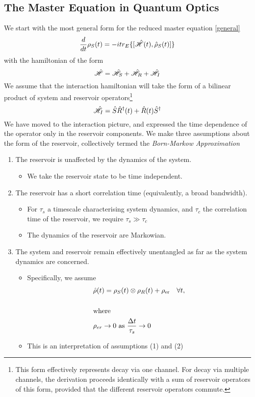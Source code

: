 \subsection{The Master Equation in Quantum Optics}
We start with the most general form for the reduced master equation \cref{general}
\begin{equation}
	\frac{d}{dt} \rho_S (t) = -itr_E\{[\hat{\mathscr{H}}(t), \hat{\rho}_S(t)]\}
\end{equation}
with the hamiltonian of the form 
\begin{equation}
  \hat{\mathscr{H}} = \hat{\mathscr{H}}_S + \hat{\mathscr{H}}_R + \hat{\mathscr{H}}_{I}
\end{equation}
We assume that the interaction hamiltonian will take the form of a bilinear product of system and reservoir operators\footnote{This form effectively represents decay via one channel. For decay via multiple channels, the derivation proceeds identically with a sum of reservoir operators of this form, provided that the different reservoir operators commute.}
\begin{equation}
  \hat{\mathscr{H}}_{I} = \hat{S}\hat{R}^\dagger (t)+ \hat{R}(t)\hat{S}^\dagger
\end{equation}
We have moved to the interaction picture, and expressed the time dependence of the operator only in the reservoir components.
We make three assumptions about the form of the reservoir, collectively termed the \emph{Born-Markow Approximation}
\begin{enumerate}
  \item The reservoir is unaffected by the dynamics of the system.
    \begin{itemize}
      \item We take the reservoir state to be time independent.
    \end{itemize}
  \item The reservoir has a short correlation time (equivalently, a broad bandwidth).
    \begin{itemize}
      \item For $\tau_s$ a timescale characterising system dynamics, and $\tau_c$ the correlation time of the reservoir, we require $\tau_s \gg \tau_c$
      \item The dynamics of the reservoir are Markowian.
    \end{itemize}
  \item The system and reservoir remain effectively unentangled as far as the system dynamics are concerned.
    \begin{itemize}
      \item Specifically, we assume 
        \begin{align*}
          &\hat{\rho}(t) = \rho_S(t)  \otimes \rho_R(t) + \rho_{\text{er}}\quad \forall t,\\
          &\\
          &\text{where}\\
          &\rho_{er} \rightarrow 0 \text{ as } \frac{\Delta t}{\tau_s} \rightarrow 0
        \end{align*}
      \item This is an interpretation of assumptions (1) and (2)
    \end{itemize}
\end{enumerate}
